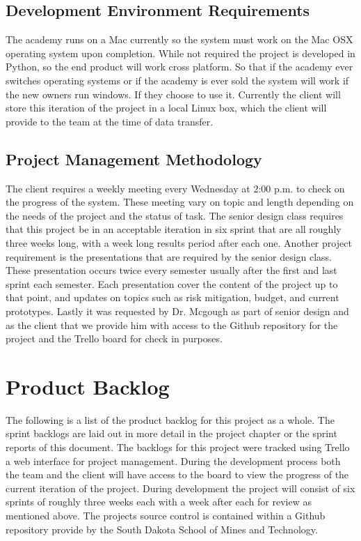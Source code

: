 \subsection{Development Environment Requirements}
The academy runs on a Mac currently so the system must work on the Mac OSX operating system upon completion. While not required the project is developed in Python, so the end product will work cross platform. So that if the academy ever switches operating systems or if the academy is ever sold the system will work if the new owners run windows. If they choose to use it. Currently the client will store this iteration of the project in a local Linux box, which the client will provide to the team at the time of data transfer.


\subsection{Project  Management Methodology}
The client requires a weekly meeting every Wednesday at 2:00 p.m. to check on the progress of the system. These meeting vary on topic and length depending on the needs of the project and the status of task. The senior design class requires that this project be in an acceptable iteration in six sprint that are all roughly three weeks long, with a week long results period after each one. Another project requirement is the presentations that are required by the senior design class. These presentation occurs twice every semester usually after the first and last sprint each semester. Each presentation cover the content of the project up to that point, and updates on topics such as risk mitigation, budget, and current prototypes. Lastly it was requested by Dr. Mcgough as part of senior design and as the client that we provide him with access to the Github repository for the project and the Trello board for check in purposes.


\section{Product Backlog}
The following is a list of the product backlog for this project as a whole.  The sprint backlogs are laid out in more detail in the project chapter or the sprint reports of this document. The backlogs for this project were tracked using Trello a web interface for project management. During the development process both the team and the client will have access to the board to view the progress of the current iteration of the project. During development the project will consist of six sprints of roughly three weeks each with a week after each for review as mentioned above. The projects source control is contained within a Github repository provide by the South Dakota School of Mines and Technology. 

